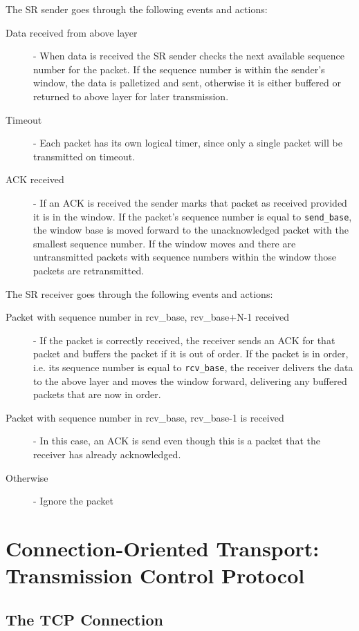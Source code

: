 \documentclass[12pt letter]{report}
\begin{document}
The SR sender goes through the following events and actions:
\begin{description}
  \item[Data received from above layer]  - When data is received the
    SR sender checks the next available sequence number for the
    packet. If the sequence number is within the sender's window, the
    data is palletized and sent, otherwise it is either buffered or
    returned to above layer for later transmission.
  \item[Timeout] - Each packet has its own logical timer, since only
    a single packet will be transmitted on timeout.
  \item[ACK received] - If an ACK is received the sender marks that
    packet as received provided it is in the window. If the packet's
    sequence number is equal to \lstinline{send_base}, the window
    base is moved forward to the unacknowledged packet with the
    smallest sequence number. If the window moves and there are
    untransmitted packets with sequence numbers within the window
    those packets are retransmitted.
\end{description}

The SR receiver goes through the following events and actions:
\begin{description}
  \item[Packet with sequence number in rcv\_base, rcv\_base+N-1
    received] - If the packet is correctly
    received, the receiver sends an ACK for that packet and
    buffers the packet if it is out of order. If the packet is in
    order, i.e. its sequence number is equal to \lstinline{rcv_base},
    the receiver delivers the data to the above layer and moves the
    window forward, delivering any buffered packets that are now in
    order.
  \item[Packet with sequence number in rcv\_base, rcv\_base-1 is
    received] - In this case, an ACK is send even though this is a
    packet that the receiver has already acknowledged.
  \item[Otherwise] - Ignore the packet
\end{description}

\chapter{Connection-Oriented Transport: Transmission Control Protocol}

\section{The TCP Connection}
\end{document}
